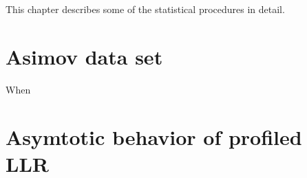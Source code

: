 This chapter describes some of the statistical procedures in detail. 

\section{Asimov data set}

When \cite{cowan_asimov}



\section{Asymtotic behavior of profiled LLR}

